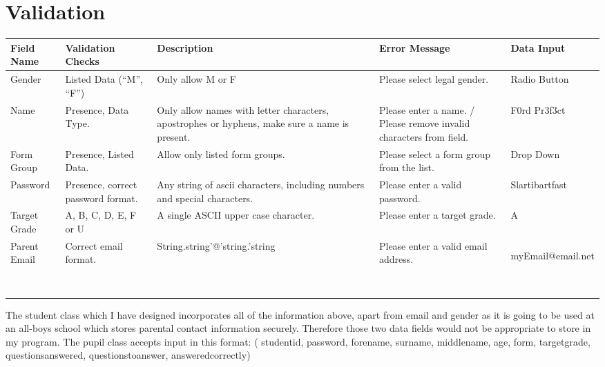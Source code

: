 \documentclass[a4paper,12pt]{report}
\begin{document}
\section{Validation}


\bigskip

\begin{flushleft}
\tablefirsthead{}
\tablehead{}
\tabletail{}
\tablelasttail{}
\begin{supertabular}{|m{0.7156598in}|m{0.69835985in}|m{2.19556in}|m{0.8288598in}|m{1.5691599in}|}
\hline
Field Name &
Validation Checks &
Description &
Error Message &
Data Input\\\hline
Gender &
Listed Data (``M'', ``F'') &
Only allow M or F &
Please select legal gender. &
Radio Button\\\hline
Name &
Presence, Data Type. &
Only allow names with letter characters, apostrophes or hyphens, make sure a name is present. &
Please enter a name. / Please remove invalid characters from field. &
F0rd Pr3f3ct\\\hline
Form Group &
Presence, Listed Data. &
Allow only listed form groups. &
Please select a form group from the list. &
Drop Down\\\hline
Password &
Presence, correct password format. &
Any string of ascii characters, including numbers and special characters. &
Please enter a valid password. &
Slartibartfast\\\hline
Target Grade &
A, B, C, D, E, F or U &
A single ASCII upper case character. &
Please enter a target grade. &
A\\\hline
Parent Email &
Correct email format. &
{}String.string'@'string.'string &
Please enter a valid email address. &
myEmail@email.net

~
\\\hline
\end{supertabular}
\end{flushleft}

\bigskip


\bigskip

The student class which I have designed incorporates all of the information above, apart from email and gender as it is going to be used at an all-boys school which stores parental contact information securely. Therefore those two data fields would not be appropriate to store in my program. The pupil class accepts input in this format: ( studentid, password, forename, surname, middlename, age, form, targetgrade, questionsanswered, questionstoanswer, answeredcorrectly)
\end{document}
